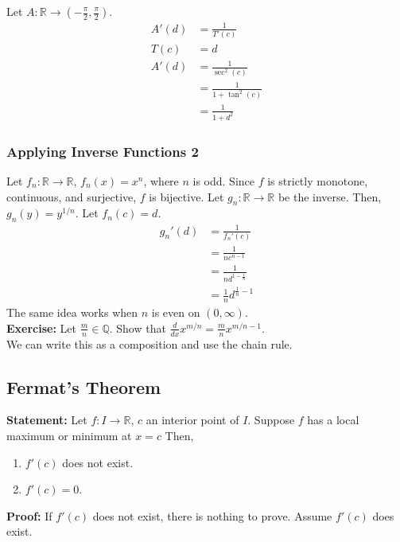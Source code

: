 \documentclass[10pt]{extarticle}
\newcommand{\Q}{\mathbb{Q}}
\newcommand{\R}{\mathbb{R}}
\begin{document}
    Let $A: \R\rightarrow \left(-\frac{\pi}{2},\frac{\pi}{2}\right)$. 
    \begin{align*}
      A'(d) &= \frac{1}{T'(c)}\\
      T(c) &= d\\
      A'(d) &= \frac{1}{\sec^2(c)}\\
            &=\frac{1}{1 + \tan^{2}(c)}\\
            &=\frac{1}{1+d^2}
    \end{align*}
  \subsubsection{Applying Inverse Functions 2}%
    Let $f_n: \R\rightarrow\R$, $f_n(x) = x^n$, where $n$ is odd. Since $f$ is strictly monotone, continuous, and surjective, $f$ is bijective. Let $g_n: \R\rightarrow \R$ be the inverse. Then, $g_n(y) = y^{1/n}$. Let $f_n(c) = d$.
    \begin{align*}
      g_n'(d) &= \frac{1}{f_n'(c)}\\
              &= \frac{1}{nc^{n-1}}\\
              &= \frac{1}{nd^{1-\frac{1}{n}}}\\
              &= \frac{1}{n}d^{\frac{1}{n}-1}
    \end{align*}
    The same idea works when $n$ is even on $(0,\infty)$.\\

    \textbf{Exercise:} Let $\frac{m}{n}\in\Q$. Show that $\frac{d}{dx}x^{m/n} = \frac{m}{n}x^{m/n-1}$.\\

    We can write this as a composition and use the chain rule.
  \subsection{Fermat's Theorem}%
    \textbf{Statement:} Let $f: I\rightarrow \R$, $c$ an interior point of $I$. Suppose $f$ has a local maximum or minimum at $x=c$ Then,
    \begin{enumerate}[(1)]
      \item $f'(c)$ does not exist.
      \item $f'(c) = 0$.
    \end{enumerate}

    \textbf{Proof:} If $f'(c)$ does not exist, there is nothing to prove. Assume $f'(c)$ does exist.\\
\end{document}
